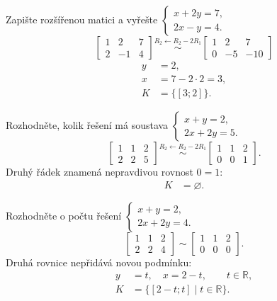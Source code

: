 \documentclass[11pt,a4paper]{article}
\begin{document}
\begin{zadaniReseniBox}[title={Samostatná práce 1}]
Zapište rozšířenou matici a vyřešte $\begin{cases}x+2y=7,\\2x-y=4.\end{cases}$
\tcblower
\[
\left[\begin{array}{cc|c}1&2&7\\2&-1&4\end{array}\right]
\overset{R_2\leftarrow R_2-2R_1}{\sim}
\left[\begin{array}{cc|c}1&2&7\\0&-5&-10\end{array}\right]
\]
\[\begin{aligned}
y&=2,\\x&=7-2\cdot2=3,\\K&=\{[3;2]\}.
\end{aligned}\]
\end{zadaniReseniBox}

\begin{zadaniReseniBox}[title={Samostatná práce 2}]
Rozhodněte, kolik řešení má soustava $\begin{cases}x+y=2,\\2x+2y=5.\end{cases}$
\tcblower
\[
\left[\begin{array}{cc|c}1&1&2\\2&2&5\end{array}\right]
\overset{R_2\leftarrow R_2-2R_1}{\sim}
\left[\begin{array}{cc|c}1&1&2\\0&0&1\end{array}\right].
\]
Druhý řádek znamená nepravdivou rovnost $0=1$:
\[\begin{aligned}K&=\varnothing.\end{aligned}\]
\end{zadaniReseniBox}

\begin{zadaniReseniBox}[title={Rozšíření 1}]
Rozhodněte o počtu řešení $\begin{cases}x+y=2,\\2x+2y=4.\end{cases}$
\tcblower
\[
\left[\begin{array}{cc|c}1&1&2\\2&2&4\end{array}\right]
\sim
\left[\begin{array}{cc|c}1&1&2\\0&0&0\end{array}\right].
\]
Druhá rovnice nepřidává novou podmínku:
\[\begin{aligned}
y&=t,\quad x=2-t,\qquad t\in\mathbb R,\\
K&=\{[2-t;t]\mid t\in\mathbb R\}.
\end{aligned}\]
\end{zadaniReseniBox}
\end{document}
